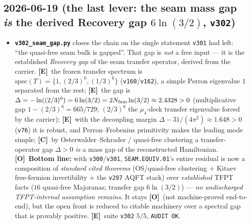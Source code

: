 \documentclass[11pt]{article}
\providecommand{\mE}{\textbf{[E]}}\providecommand{\mC}{\textbf{[C]}}
\providecommand{\mO}{\textbf{[O]}}\providecommand{\mX}{\textbf{[X]}}
\providecommand{\vref}[1]{\texttt{#1}}
\begin{document}
\subsection*{2026-06-19 (the last lever: the seam mass gap \emph{is} the derived Recovery gap $6\ln(3/2)$, \texttt{v302})}
\begin{itemize}
\item \textbf{\texttt{v302\_seam\_gap.py}} closes the chain on the single statement \vref{v301} had left:
  ``the quasi-free seam bulk is gapped''.  That gap is \emph{not} a free input --- it is the established
  \emph{Recovery gap} of the seam transfer operator, derived from the carrier.  \mE\ the frozen transfer
  spectrum is $\mathrm{spec}(T)=\{1,(2/3)^6,(1/3)^6\}$ (\vref{v160}/\vref{v162}), a simple Perron eigenvalue
  $1$ separated from the rest; \mE\ the gap is $\Delta=-\ln((2/3)^6)=6\ln(3/2)=2N_{\mathrm{fam}}\ln(3/2)\approx2.4328>0$
  (multiplicative gap $1-(2/3)^6=665/729$; $(2/3)^6$ the $\mu_4$-deck transfer eigenvalue forced by the
  carrier); \mE\ with the decoupling margin $\Delta-31/(4\pi^2)\approx1.648>0$ (\vref{v76}) it is robust, and
  Perron--Frobenius primitivity makes the leading mode simple; \mC\ by Osterwalder--Schrader / quasi-free
  clustering a transfer-operator gap $\Delta>0$ \emph{is} a mass gap of the reconstructed Hamiltonian.
  \mO\ \textbf{Bottom line:} with \vref{v300}/\vref{v301}, \texttt{SEAM.EQUIV.01}'s entire residual is now a
  composition of \emph{standard cited theorems} (OS/quasi-free clustering $+$ Kitaev free-fermion invertibility
  $+$ the \vref{v297} AQFT stack) over \emph{established} TFPT facts ($16$ quasi-free Majoranas; transfer gap
  $6\ln(3/2)$) --- \emph{no undischarged TFPT-internal assumption remains}.  It stays \mO\ (not machine-proved
  end-to-end), but the open front is reduced to citable machinery over a spectral gap that is provably positive.
  \mE\ suite \texttt{v302} $5/5$, \texttt{AUDIT OK}.
\end{itemize}
\end{document}
